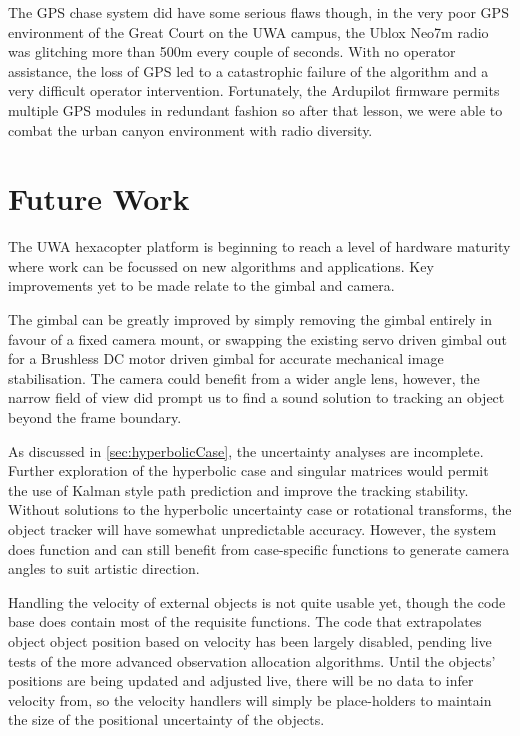 \documentclass[a4paper, 11pt, titlepage]{article}
\begin{document}
      The GPS chase system did have some serious flaws though, in the very poor GPS environment of the Great Court on the UWA campus, the Ublox Neo7m radio was glitching more than 500m every couple of seconds.  With no operator assistance, the loss of GPS led to a catastrophic failure of the algorithm and a very difficult operator intervention.  Fortunately, the Ardupilot firmware permits multiple GPS modules in redundant fashion so after that lesson, we were able to combat the urban canyon environment with radio diversity.

\section{Future Work}

  The UWA hexacopter platform is beginning to reach a level of hardware maturity where work can be focussed on new algorithms and applications.  Key improvements yet to be made relate to the gimbal and camera.

  The gimbal can be greatly improved by simply removing the gimbal entirely in favour of a fixed camera mount, or swapping the existing servo driven gimbal out for a Brushless DC motor driven gimbal for accurate mechanical image stabilisation.  The camera could benefit from a wider angle lens, however, the narrow field of view did prompt us to find a sound solution to tracking an object beyond the frame boundary.

  As discussed in \ref{sec:hyperbolicCase}, the uncertainty analyses are incomplete.  Further exploration of the hyperbolic case and singular matrices would permit the use of Kalman style path prediction and improve the tracking stability.
  Without solutions to the hyperbolic uncertainty case or rotational transforms, the object tracker will have somewhat unpredictable accuracy.  However, the system does function and can still benefit from case-specific functions to generate camera angles to suit artistic direction.

  Handling the velocity of external objects is not quite usable yet, though the code base does contain most of the requisite functions.  The code that extrapolates object object position based on velocity has been largely disabled, pending live tests of the more advanced observation allocation algorithms.  Until the objects' positions are being updated and adjusted live, there will be no data to infer velocity from, so the velocity handlers will simply be place-holders to maintain the size of the positional uncertainty of the objects.
\end{document}
